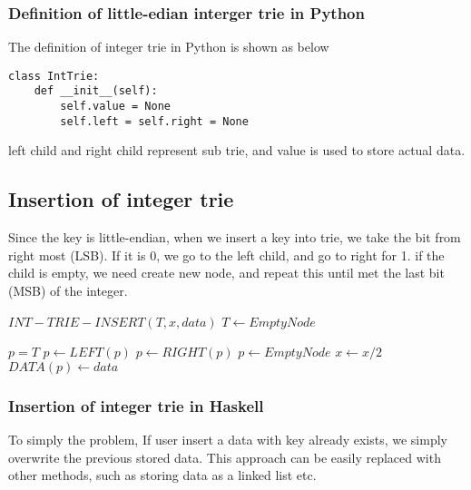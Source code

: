 \documentclass{article}
\begin{document}
\subsubsection*{Definition of little-edian interger trie in Python}
The definition of integer trie in Python is shown as below

\lstset{language=Python}
\begin{lstlisting}
class IntTrie:
    def __init__(self):
        self.value = None
        self.left = self.right = None
\end{lstlisting}

left child and right child represent sub trie, and value is used to 
store actual data.

\subsection{Insertion of integer trie}
Since the key is little-endian, when we insert a key into trie, we take the
bit from right most (LSB). If it is 0, we go to the left child, and go to right
for 1. if the child is empty, we need create new node, and repeat this until
met the last bit (MSB) of the integer.

\begin{algorithmic}
\STATE $INT-TRIE-INSERT(T, x, data)$
   \STATE $T \leftarrow EmptyNode$ \ENDIF

  \STATE $p=T$
      \STATE $p \leftarrow LEFT(p)$
    \ELSE
      \STATE $p \leftarrow RIGHT(p)$
    \ENDIF
      \STATE $p \leftarrow EmptyNode$ \ENDIF
    \STATE $x \leftarrow x/2$
  \ENDWHILE
  \STATE $DATA(p) \leftarrow data$
\end{algorithmic}

\subsubsection*{Insertion of integer trie in Haskell}
To simply the problem, If user insert a data with key already exists, we simply
overwrite the previous stored data. This approach can be easily replaced with 
other methods, such as storing data as a linked list etc.
\end{document}
